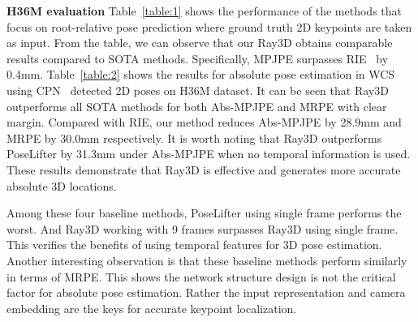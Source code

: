 \documentclass[10pt,twocolumn,letterpaper]{article}
\begin{document}
\noindent\textbf{H36M evaluation}
Table~\ref{table:1} shows the performance of the methods that focus on root-relative pose prediction where ground truth 2D keypoints are taken as input. From the table, we can observe that our Ray3D obtains comparable results compared to SOTA methods. Specifically, MPJPE surpasses RIE~\cite{wenkang2021improving} by 0.4mm. Table~\ref{table:2} shows the results for absolute pose estimation in WCS using CPN~\cite{cpn} detected 2D poses on H36M dataset. It can be seen that Ray3D outperforms all SOTA methods for both Abs-MPJPE and MRPE with clear margin. Compared with RIE, our method reduces Abs-MPJPE by 28.9mm and MRPE by 30.0mm respectively. It is worth noting that Ray3D outperforms PoseLifter by 31.3mm under Abs-MPJPE when no temporal information is used. These results demonstrate that Ray3D is effective and generates more accurate absolute 3D locations. 

Among these four baseline methods, PoseLifter using single frame performs the worst. And Ray3D working with 9 frames surpasses Ray3D using single frame. This verifies the benefits of using temporal features for 3D pose estimation. Another interesting observation is that these baseline methods perform similarly in terms of MRPE. This shows the network structure design is not the critical factor for absolute pose estimation. Rather the input representation and camera embedding are the keys for accurate keypoint localization. 
\end{document}
